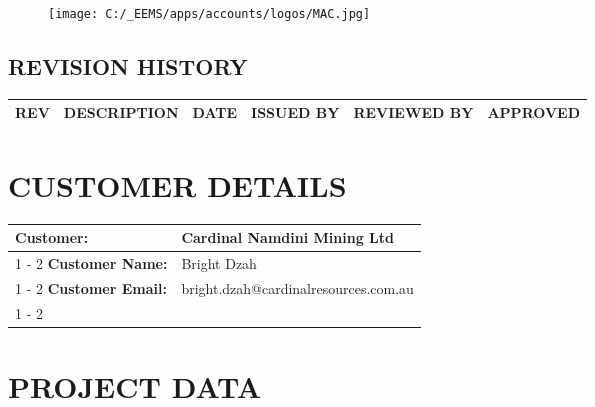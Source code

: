 \documentclass{article}%
\begin{document}
\begin{figure}[h!]%
\texttt{[image: C:/\_EEMS/apps/accounts/logos/MAC.jpg]}%
\centering%
\end{figure}

%
\newpage%
\begin{center}%
\section*{REVISION HISTORY}%
\label{sec:REVISIONHISTORY}%

%
\begin{minipage}{\textwidth}%
\centering%
\begin{tabular}{|c |c |c |c |c |c |}%
\hline%
\textbf{REV}&\textbf{DESCRIPTION}&\textbf{DATE}&\textbf{ISSUED BY}&\textbf{REVIEWED BY}&\textbf{APPROVED}\\%
\hline%
\end{tabular}%
\end{minipage}%
\end{center}%
\newpage%
\section{CUSTOMER DETAILS}%
\label{sec:CUSTOMERDETAILS}%
\begin{flushleft}%
\begin{minipage}{\textwidth}%
\centering%
\begin{tabular}{|l |l |}%
\hline%
\textbf{Customer:}&Cardinal Namdini Mining Ltd\\%
\cline{1%
-%
2}%
\textbf{Customer Name:}&Bright Dzah\\%
\cline{1%
-%
2}%
\textbf{Customer Email:}&bright.dzah@cardinalresources.com.au\\%
\cline{1%
-%
2}%
\end{tabular}%
\end{minipage}%
\end{flushleft}

%
\newpage%
\section{PROJECT DATA}%
\label{sec:PROJECTDATA}%
\end{document}
